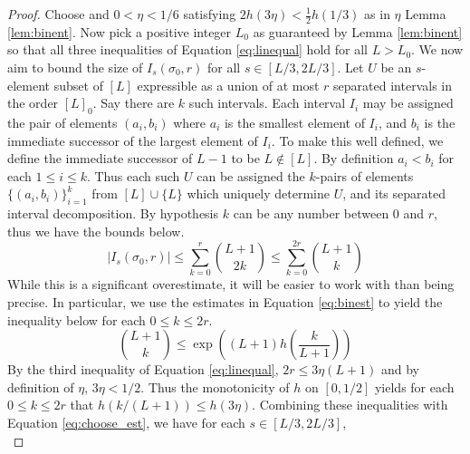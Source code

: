 \documentclass[11pt,a4paper]{amsart}
\theoremstyle{definition}
\theoremstyle{remark}
\begin{document}
\begin{proof}
Choose and $0 < \eta < 1/6$ satisfying $2h(3\eta) < \frac{1}{2}h(1/3)$ as in $\eta$ Lemma \ref{lem:binent}.  Now pick a positive integer $L_{0}$ as guaranteed by Lemma \ref{lem:binent} so that all three inequalities of Equation \ref{eq:linequal} hold for all $L > L_{0}$.  We now aim to bound the size of $I_{s}(\sigma_{0},r)$ for all $s \in [L/3, 2L/3]$. 
 Let $U$ be an $s$-element subset of $[L]$ expressible as a union of at most $r$ separated intervals in the order $[L]_{0}$.  Say there are $k$ such intervals.  Each interval $I_{i}$ may be assigned the pair of elements $(a_{i},b_{i})$ where $a_{i}$ is the smallest element of $I_{i}$, and $b_{i}$ is the immediate successor of the largest element of $I_{i}$.  To make this well defined, we define the immediate successor of $L-1$ to be $L \notin [L]$.  By definition $a_{i} < b_{i}$ for each $1 \leq i \leq k$.  Thus each such $U$ can be assigned the $k$-pairs of elements $\{(a_{i},b_{i})\}_{i=1}^{k}$ from $[L]\cup\{L\}$ which uniquely determine $U$, and its separated interval decomposition.  By hypothesis $k$ can be any number between $0$ and $r$, thus we have the bounds below.  
\begin{equation}\label{eq:choose_est}
|I_{s}(\sigma_{0},r)| \leq \sum_{k = 0}^{r} \binom{L+1}{2k} \leq \sum_{k=0}^{2r} \binom{L+1}{k}
\end{equation}
While this is a significant overestimate, it will be easier to work with than being precise.  In particular, we use the estimates in Equation \ref{eq:binest} to yield the inequality below for each $0 \leq k \leq 2r$.  
\begin{equation*}
\binom{L+1}{k} \leq \exp\left((L+1)h\left(\frac{k}{L+1}\right)\right)
\end{equation*}
By the third inequality of Equation \ref{eq:linequal}, $2r \leq 3\eta(L+1)$ and by definition of $\eta$, $3\eta < 1/2$.  Thus the monotonicity of $h$ on $[0,1/2]$ yields for each $0 \leq k \leq 2r$ that $h(k/(L+1)) \leq h(3\eta)$.  Combining these inequalities with Equation \ref{eq:choose_est}, we have for each $s \in [L/3,2L/3]$,
\begin{equation*}

\end{equation*}
\end{proof}
\end{document}
